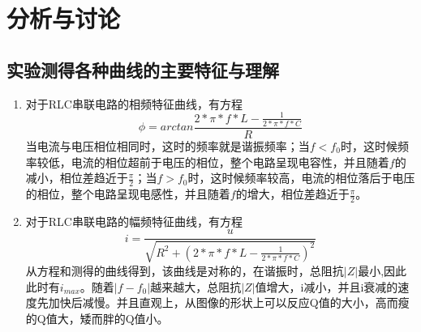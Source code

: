 \documentclass[a4paper,11pt]{article}
\begin{document}
\section{分析与讨论}
\subsection{实验测得各种曲线的主要特征与理解}
\begin{enumerate}
	\item 对于RLC串联电路的相频特征曲线，有方程
	\begin{equation}
		\phi = arctan{\dfrac{2*\pi*f * L - \frac{1}{2*\pi*f * C}}{R}} 
	\end{equation}
	当电流与电压相位相同时，这时的频率就是谐振频率；当$ f < f_{0} $时，这时候频率较低，电流的相位超前于电压的相位，整个电路呈现电容性，并且随着$ f $的减小，相位差趋近于$ \frac{\pi}{2} $；当$ f > f_{0} $时，这时候频率较高，电流的相位落后于电压的相位，整个电路呈现电感性，并且随着$ f $的增大，相位差趋近于$ \frac{\pi}{2} $。
	
	\item 对于RLC串联电路的幅频特征曲线，有方程
	\begin{equation}
		i= \dfrac{u}{\sqrt{R^{2} + (2*\pi*f * L - \frac{1}{2*\pi*f * C}) ^{2}}} 
	\end{equation}
    从方程和测得的曲线得到，该曲线是对称的，在谐振时，总阻抗$ \left | Z \right |$最小,因此此时有$ i_{max} $。随着$ \left | f-f_{0} \right |$越来越大，总阻抗$ \left | Z \right |$值增大，i减小，并且i衰减的速度先加快后减慢。并且直观上，从图像的形状上可以反应Q值的大小，高而瘦的Q值大，矮而胖的Q值小。
    
	
	
\end{enumerate}
	
\end{document}
